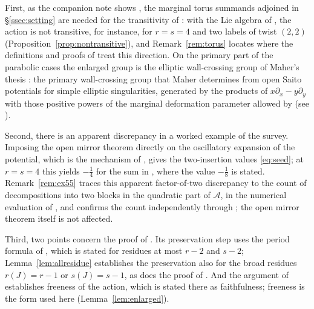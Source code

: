 \documentclass[11pt]{amsart}
\theoremstyle{definition}
\theoremstyle{remark}
\newcommand{\Ascr}{\mathcal{A}}
\begin{document}
First, as the companion note shows \cite[Rem.~3.1 and Ex.~3.2]{note}, the
marginal torus summands adjoined in \S\ref{ssec:setting} are
needed for the transitivity of \cite[Thm.~4.27]{GKT}: with the Lie algebra of
\cite[Def.~4.23]{GKT}, the action is not transitive, for instance, for $r=s=4$
and two labels of twist $(2,2)$ (Proposition~\ref{prop:nontransitive}), and
Remark~\ref{rem:torus} locates where the definitions and proofs of \cite{GKT}
treat this direction.
On the primary part of the parabolic cases the enlarged group is the elliptic
wall-crossing group of Maher's thesis \cite[\S5.2.2]{Maher}: the primary
wall-crossing group that Maher determines from open Saito potentials for
simple elliptic singularities, generated by the products of
$x\partial_x-y\partial_y$ with those positive powers of the marginal
deformation parameter allowed by \cite[(5.2.8)]{Maher} (see
\cite[Cor.~5.2.7, Prop.~5.2.10]{Maher}).

Second, there is an apparent discrepancy in a worked example of the survey.
Imposing the open mirror theorem \cite[Thm.~0.3]{GKT} directly on the
oscillatory expansion of the potential, which is the mechanism of
\cite[Thm.~0.2]{GKT}, gives the two-insertion values \eqref{eq:seed}; at $r=s=4$ this
yields $-\tfrac14$ for the sum in \cite[Ex.~5.5]{GKTsurvey}, where the value
$-\tfrac18$ is stated.  Remark~\ref{rem:ex55} traces this apparent
factor-of-two discrepancy to the count of decompositions into two blocks in
the quadratic part of $\Ascr$, in the numerical evaluation of
\cite[Ex.~5.5]{GKTsurvey}, and confirms the count
independently through \cite[Cor.~5.11(3)]{GKT}; the open mirror theorem itself
is not affected.

Third, two points concern the proof of \cite[Thm.~4.27]{GKT}.  Its
preservation step \cite[proof of Thm.~4.27, Step~1]{GKT} uses the period
formula of \cite[Thm.~4.9]{GKT}, which is stated for residues at most $r-2$
and $s-2$; Lemma~\ref{lem:allresidue} establishes the preservation also for
the broad residues $r(J)=r-1$ or $s(J)=s-1$, as does the proof of
\cite[Prop.~1.4]{note}.  And the argument of
\cite[Thm.~4.27, Step~2]{GKT} establishes freeness of the action, which is
stated there as faithfulness; freeness is the form used here
(Lemma~\ref{lem:enlarged}).
\end{document}
